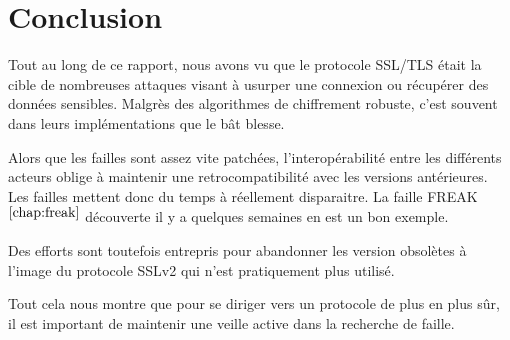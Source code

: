 \chapter*{Conclusion}
\label{chapter:ccl}

Tout au long de ce rapport, nous avons vu que le protocole SSL/TLS était la cible de nombreuses attaques visant à usurper une connexion ou récupérer des données sensibles. Malgrès des algorithmes de chiffrement robuste, c'est souvent dans leurs implémentations que le bât blesse.

Alors que les failles sont assez vite patchées, l'interopérabilité entre les différents acteurs oblige à maintenir
une retrocompatibilité avec les versions antérieures. Les failles mettent donc du temps à réellement disparaitre.
La faille FREAK$^{\ref{chap:freak}}$ découverte il y a quelques semaines en est un bon exemple.

Des efforts sont toutefois entrepris pour abandonner les version obsolètes à l'image du protocole SSLv2 qui n'est
pratiquement plus utilisé.

Tout cela nous montre que pour se diriger vers un protocole de plus en plus sûr, il est important de maintenir une veille active dans la recherche de faille. 
